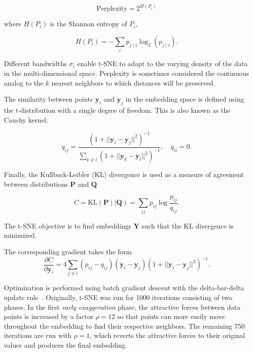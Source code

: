\documentclass[twocolumn]{bmcart}
\begin{document}
\begin{equation}
\text{Perplexity} = 2^{H(P_i)}
\end{equation}

\noindent where $H(P_i)$ is the Shannon entropy of $P_i$,

\begin{equation}
H(P_i) = -\sum_i p_{j \mid i} \log_2 (p_{j \mid i}).
\end{equation}

\noindent Different bandwidths $\sigma_i$ enable t-SNE to adapt to the varying
density of the data in the multi-dimensional space. Perplexity is sometimes
considered the continuous analog to the $k$ nearest neighbors to which
distances will be preserved. 

The similarity between points $\mathbf{y}_i$ and $\mathbf{y}_j$ in the
embedding space is defined using the $t$-distribution with a single degree of
freedom. This is also known as the Cauchy kernel:

\begin{equation}
q_{ij} = \frac{\left ( 1 + || \mathbf{y}_i - \mathbf{y}_j ||^2 \right )^{-1}}
{\sum_{k \neq l}\left ( 1 + || \mathbf{y}_k - \mathbf{y}_l ||^2 \right )^{-1}},
\quad q_{ii} = 0.
\label{eq:cauchy_kernel}
\end{equation}

Finally, the Kullback-Leibler (KL) divergence is used as a measure of agreement
between distributions $\mathbf{P}$ and $\mathbf{Q}$

\begin{equation}
C = \text{KL}(\mathbf{P} \mid \mid \mathbf{Q}) = \sum_{ij} p_{ij} \log \frac{p_{ij}}{q_{ij}}.
\label{eq:kl_divergence}
\end{equation}

\noindent The t-SNE objective is to find embeddings $\mathbf{Y}$ such that the
KL divergence is minimized.

The corresponding gradient takes the form
\begin{equation}
\frac{\partial C}{\partial \mathbf{y}_i} = 4 \sum_{j \neq i} \left ( p_{ij} - q_{ij} \right ) \left ( \mathbf{y}_i - \mathbf{y}_j \right ) \left ( 1 + || \mathbf{y}_i - \mathbf{y}_j || ^2 \right )^{-1}.
\label{eq:tsne_gradient}
\end{equation}

Optimization is performed using batch gradient descent with the delta-bar-delta
update rule~\cite{jacobs1988increased}. Originally, t-SNE was run for 1000
iterations consisting of two phases. In the first \textit{early exaggeration}
phase, the attractive forces between data points is increased by a factor
$\rho=12$ so that points can more easily move throughout the embedding to find
their respective neighbors. The remaining 750 iterations are run with $\rho=1$,
which reverts the attractive forces to their original values and produces the
final embedding.
\end{document}

